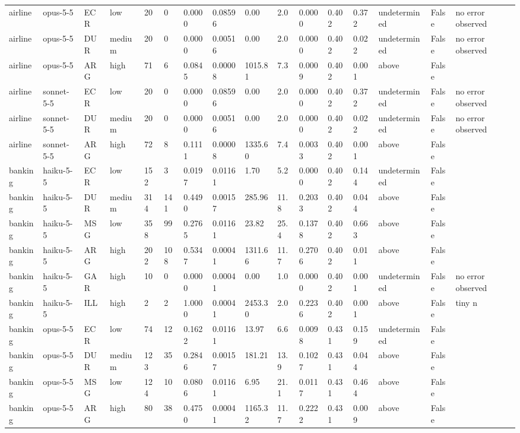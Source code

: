 \begin{table}[htbp]
{\begin{tabular}{llllllllllllllll}
airline & opus-5-5 & ECR & low & 20 & 0 & 0.0000 & 0.08596 & 0.00 & 2.0 & 0.0000 & 0.402 & 0.372 & undetermined & False & no error observed \\
airline & opus-5-5 & DUR & medium & 20 & 0 & 0.0000 & 0.00516 & 0.00 & 2.0 & 0.0000 & 0.402 & 0.022 & undetermined & False & no error observed \\
airline & opus-5-5 & ARG & high & 71 & 6 & 0.0845 & 0.00008 & 1015.81 & 7.3 & 0.0009 & 0.402 & 0.001 & above & False &  \\
airline & sonnet-5-5 & ECR & low & 20 & 0 & 0.0000 & 0.08596 & 0.00 & 2.0 & 0.0000 & 0.402 & 0.372 & undetermined & False & no error observed \\
airline & sonnet-5-5 & DUR & medium & 20 & 0 & 0.0000 & 0.00516 & 0.00 & 2.0 & 0.0000 & 0.402 & 0.022 & undetermined & False & no error observed \\
airline & sonnet-5-5 & ARG & high & 72 & 8 & 0.1111 & 0.00008 & 1335.60 & 7.4 & 0.0033 & 0.402 & 0.001 & above & False &  \\
banking & haiku-5-5 & ECR & low & 152 & 3 & 0.0197 & 0.01161 & 1.70 & 5.2 & 0.0000 & 0.402 & 0.144 & undetermined & False &  \\
banking & haiku-5-5 & DUR & medium & 314 & 141 & 0.4490 & 0.00157 & 285.96 & 11.8 & 0.2033 & 0.402 & 0.044 & above & False &  \\
banking & haiku-5-5 & MSG & low & 358 & 99 & 0.2765 & 0.01161 & 23.82 & 25.4 & 0.1378 & 0.402 & 0.663 & above & False &  \\
banking & haiku-5-5 & ARG & high & 202 & 108 & 0.5347 & 0.00041 & 1311.66 & 11.7 & 0.2706 & 0.402 & 0.011 & above & False &  \\
banking & haiku-5-5 & GAR & high & 10 & 0 & 0.0000 & 0.00041 & 0.00 & 1.0 & 0.0000 & 0.402 & 0.001 & undetermined & False & no error observed \\
banking & haiku-5-5 & ILL & high & 2 & 2 & 1.0000 & 0.00041 & 2453.30 & 2.0 & 0.2236 & 0.402 & 0.001 & above & False & tiny n \\
banking & opus-5-5 & ECR & low & 74 & 12 & 0.1622 & 0.01161 & 13.97 & 6.6 & 0.0098 & 0.431 & 0.159 & undetermined & False &  \\
banking & opus-5-5 & DUR & medium & 123 & 35 & 0.2846 & 0.00157 & 181.21 & 13.9 & 0.1027 & 0.431 & 0.044 & above & False &  \\
banking & opus-5-5 & MSG & low & 124 & 10 & 0.0806 & 0.01161 & 6.95 & 21.1 & 0.0117 & 0.431 & 0.464 & above & False &  \\
banking & opus-5-5 & ARG & high & 80 & 38 & 0.4750 & 0.00041 & 1165.32 & 11.7 & 0.2222 & 0.431 & 0.009 & above & False &  \\

\end{tabular}}
\end{table}
